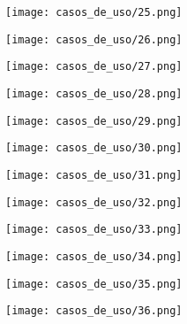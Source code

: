 \documentclass[12pt, spanish]{article}
\begin{document}
\pagebreak
\begin{centering}\texttt{[image: casos\_de\_uso/25.png]}\\[1.0 cm]\end{centering}
\pagebreak
\begin{centering}\texttt{[image: casos\_de\_uso/26.png]}\\[1.0 cm]\end{centering}
\pagebreak
\begin{centering}\texttt{[image: casos\_de\_uso/27.png]}\\[1.0 cm]\end{centering}
\pagebreak
\begin{centering}\texttt{[image: casos\_de\_uso/28.png]}\\[1.0 cm]\end{centering}
\pagebreak
\begin{centering}\texttt{[image: casos\_de\_uso/29.png]}\\[1.0 cm]\end{centering}
\pagebreak
\begin{centering}\texttt{[image: casos\_de\_uso/30.png]}\\[1.0 cm]\end{centering}
\pagebreak
\begin{centering}\texttt{[image: casos\_de\_uso/31.png]}\\[1.0 cm]\end{centering}
\pagebreak
\begin{centering}\texttt{[image: casos\_de\_uso/32.png]}\\[1.0 cm]\end{centering}
\pagebreak
\begin{centering}\texttt{[image: casos\_de\_uso/33.png]}\\[1.0 cm]\end{centering}
\pagebreak
\begin{centering}\texttt{[image: casos\_de\_uso/34.png]}\\[1.0 cm]\end{centering}
\pagebreak
\begin{centering}\texttt{[image: casos\_de\_uso/35.png]}\\[1.0 cm]\end{centering}
\pagebreak
\begin{centering}\texttt{[image: casos\_de\_uso/36.png]}\\[1.0 cm]\end{centering}
\end{document}

